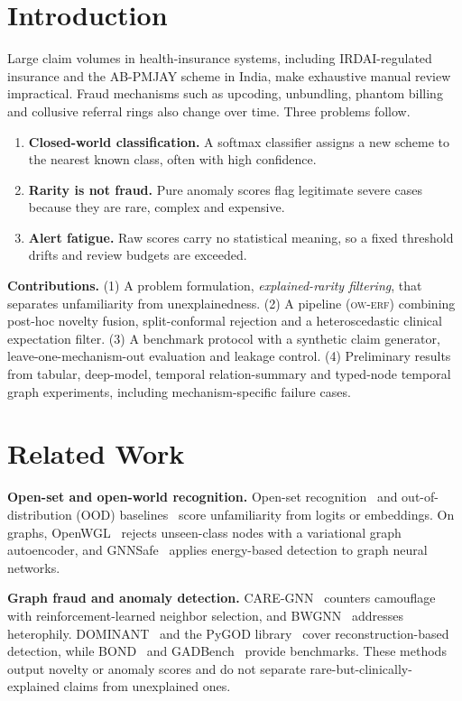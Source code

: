 \documentclass[conference]{IEEEtran}
\newcommand{\ERF}{\textsc{ow-erf}}
\begin{document}
\section{Introduction}
Large claim volumes in health-insurance systems, including IRDAI-regulated insurance and the AB-PMJAY scheme in India, make exhaustive manual review impractical. Fraud mechanisms such as upcoding, unbundling, phantom billing and collusive referral rings also change over time. Three problems follow.

\begin{enumerate}
\item \textbf{Closed-world classification.} A softmax classifier assigns a new scheme to the nearest known class, often with high confidence.
\item \textbf{Rarity is not fraud.} Pure anomaly scores flag legitimate severe cases because they are rare, complex and expensive.
\item \textbf{Alert fatigue.} Raw scores carry no statistical meaning, so a fixed threshold drifts and review budgets are exceeded.
\end{enumerate}

\textbf{Contributions.} (1) A problem formulation, \emph{explained-rarity filtering}, that separates unfamiliarity from unexplainedness. (2) A pipeline (\ERF{}) combining post-hoc novelty fusion, split-conformal rejection and a heteroscedastic clinical expectation filter. (3) A benchmark protocol with a synthetic claim generator, leave-one-mechanism-out evaluation and leakage control. (4) Preliminary results from tabular, deep-model, temporal relation-summary and typed-node temporal graph experiments, including mechanism-specific failure cases.

\section{Related Work}
\textbf{Open-set and open-world recognition.} Open-set recognition~\cite{scheirer2013,geng2021} and out-of-distribution (OOD) baselines~\cite{hendrycks2017,lee2018,liu2020energy} score unfamiliarity from logits or embeddings. On graphs, OpenWGL~\cite{wu2020openwgl} rejects unseen-class nodes with a variational graph autoencoder, and GNNSafe~\cite{wu2023gnnsafe} applies energy-based detection to graph neural networks.

\textbf{Graph fraud and anomaly detection.} CARE-GNN~\cite{dou2020care} counters camouflage with reinforcement-learned neighbor selection, and BWGNN~\cite{tang2022bwgnn} addresses heterophily. DOMINANT~\cite{ding2019dominant} and the PyGOD library~\cite{liu2024pygod} cover reconstruction-based detection, while BOND~\cite{liu2022bond} and GADBench~\cite{tang2023gadbench} provide benchmarks. These methods output novelty or anomaly scores and do not separate rare-but-clinically-explained claims from unexplained ones.
\end{document}
